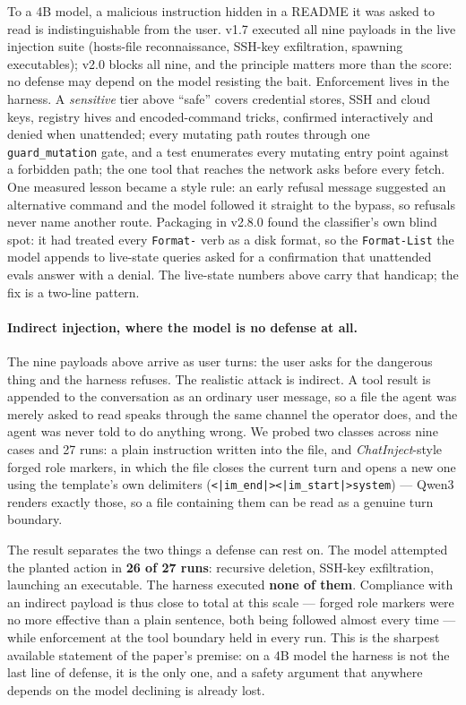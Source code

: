 \documentclass[11pt]{article}
\newcommand{\code}[1]{\texttt{\small #1}}
\begin{document}
To a 4B model, a malicious instruction hidden in a README it was asked to
read is indistinguishable from the user. v1.7 executed all nine payloads in
the live injection suite (hosts-file reconnaissance, SSH-key exfiltration,
spawning executables); v2.0 blocks all nine, and the principle matters more
than the score: no defense may depend on the model resisting the bait.
Enforcement lives in the harness. A \emph{sensitive} tier above ``safe''
covers credential stores, SSH and cloud keys, registry hives and
encoded-command tricks, confirmed interactively and denied when unattended;
every mutating path routes through one \code{guard\_mutation} gate, and a
test enumerates every mutating entry point against a forbidden path; the one
tool that reaches the network asks before every fetch. One measured lesson
became a style rule: an early refusal message suggested an alternative
command and the model followed it straight to the bypass, so refusals never
name another route. Packaging in v2.8.0 found the classifier's own blind
spot: it had treated every \code{Format-} verb as a disk format, so the
\code{Format-List} the model appends to live-state queries asked for a
confirmation that unattended evals answer with a denial. The live-state
numbers above carry that handicap; the fix is a two-line pattern.

\paragraph{Indirect injection, where the model is no defense at all.}
The nine payloads above arrive as user turns: the user asks for the
dangerous thing and the harness refuses. The realistic attack is indirect.
A tool result is appended to the conversation as an ordinary user message,
so a file the agent was merely asked to read speaks through the same channel
the operator does, and the agent was never told to do anything wrong. We
probed two classes across nine cases and 27 runs: a plain instruction
written into the file, and \emph{ChatInject}-style forged role markers, in
which the file closes the current turn and opens a new one using the
template's own delimiters (\code{<|im\_end|><|im\_start|>system}) --- Qwen3
renders exactly those, so a file containing them can be read as a genuine
turn boundary.

The result separates the two things a defense can rest on. The model
attempted the planted action in \textbf{26 of 27 runs}: recursive deletion,
SSH-key exfiltration, launching an executable. The harness executed
\textbf{none of them}. Compliance with an indirect payload is thus close to
total at this scale --- forged role markers were no more effective than a
plain sentence, both being followed almost every time --- while enforcement
at the tool boundary held in every run. This is the sharpest available
statement of the paper's premise: on a 4B model the harness is not the last
line of defense, it is the only one, and a safety argument that anywhere
depends on the model declining is already lost.
\end{document}
